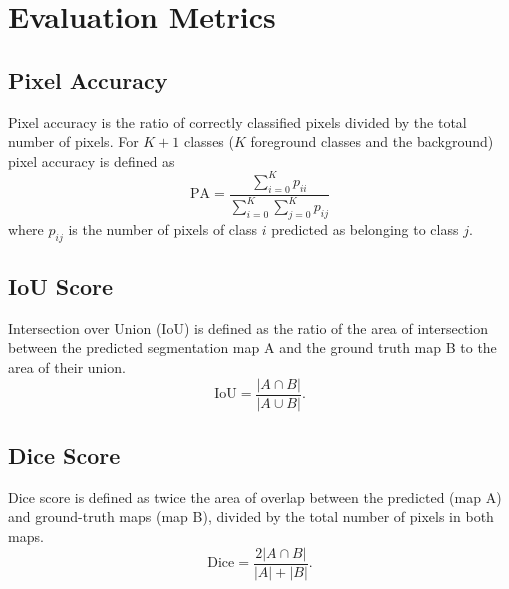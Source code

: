 \section{Evaluation Metrics}
\subsection{Pixel Accuracy}
Pixel accuracy is the ratio of correctly classified pixels divided by the total number of pixels. For $K+1$ classes ($K$ foreground classes and the background) pixel accuracy is defined as 
\begin{equation*} 
\text{PA}= \frac{\sum _{i=0}^K p_{ii}}{\sum _{i=0}^K \sum _{j=0}^K p_{ij}} 
\end{equation*} 
where $p_{ij}$ is the number of pixels of class $i$ predicted as belonging to class $j$.

\subsection{IoU Score}
Intersection over Union (IoU) is defined as the ratio of the area of intersection between the predicted segmentation map A and the ground truth map B to the area of their union.
\begin{equation*} 
\text{IoU}=  \frac{|A \cap B|}{|A \cup B|}. 
\end{equation*} 

\subsection{Dice Score}
Dice score is defined as twice the area of overlap between the predicted (map A) and ground-truth maps (map B), divided by the total number of pixels in both maps.
\begin{equation*} 
\text{Dice}= \frac{ 2| A \cap B |}{|A| + |B|}. 
\end{equation*} 